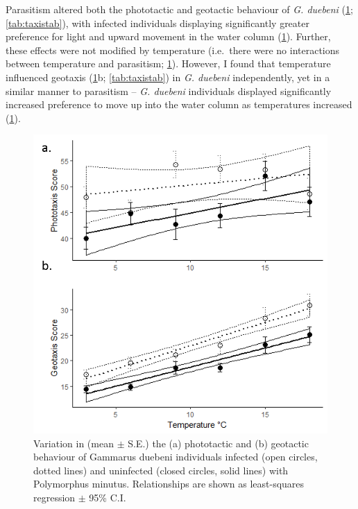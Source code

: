 Parasitism altered both the phototactic and geotactic behaviour of \emph{G. duebeni} (\ref{fig:taxis}; \ref{tab:taxistab}), with infected individuals displaying significantly greater preference for light and upward movement in the water column (\ref{fig:taxis}). Further, these effects were not modified by temperature (i.e.\ there were no interactions between temperature and parasitism; \ref{fig:taxis}). However, I found that temperature influenced geotaxis (\ref{fig:taxis}b; \ref{tab:taxistab}) in \emph{G. duebeni} independently, yet in a similar manner to parasitism – \emph{G. duebeni} individuals displayed significantly increased preference to move up into the water column as temperatures increased (\ref{fig:taxis}). 

\begin{figure}%
    \centering
    \includegraphics[scale=0.9]{figures/ch2/taxis.png}
  \caption [Impact of temperature and parasites on predator-avoidance behaviour]{Variation in (mean $\pm$ S.E.) the (a) phototactic and (b) geotactic behaviour of Gammarus duebeni individuals infected (open circles, dotted lines) and uninfected (closed circles, solid lines) with Polymorphus minutus. Relationships are shown as least-squares regression $\pm$ 95\% C.I.} 
    \label{fig:taxis}
\end{figure}

